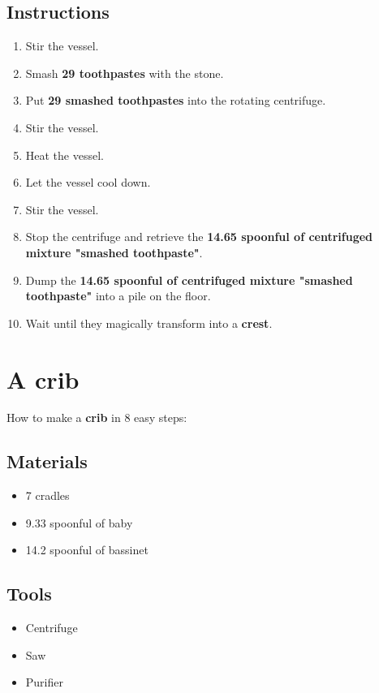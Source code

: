 \documentclass{article}
\begin{document}
\subsection{Instructions}\begin{enumerate}
\item 
Stir the vessel.
\item 
Smash \textbf{29 toothpastes} with the stone.
\item 
Put \textbf{29 smashed toothpastes} into the rotating centrifuge.
\item 
Stir the vessel.
\item 
Heat the vessel.
\item 
Let the vessel cool down.
\item 
Stir the vessel.
\item 
Stop the centrifuge and retrieve the \textbf{14.65 spoonful of centrifuged mixture "smashed toothpaste"}.
\item 
Dump the \textbf{14.65 spoonful of centrifuged mixture "smashed toothpaste"} into a pile on the floor.
\item 
Wait until they magically transform into a \textbf{crest}.
\end{enumerate}
\newpage
\section{A crib}How to make a \textbf{crib} in 8 easy steps:

\subsection{Materials}\begin{itemize}
\item 
7 cradles
\item 
9.33 spoonful of baby
\item 
14.2 spoonful of bassinet
\end{itemize}
\subsection{Tools}\begin{itemize}
\item 
Centrifuge
\item 
Saw
\item 
Purifier
\end{itemize}
\end{document}
